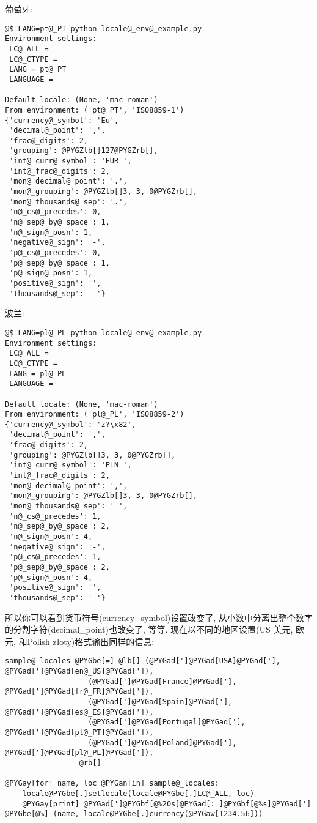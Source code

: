 \documentclass[a4paper,10pt,english]{manual}
\begin{document}
葡萄牙:

\begin{Verbatim}[commandchars=@\[\]]
@$ LANG=pt@_PT python locale@_env@_example.py
Environment settings:
 LC@_ALL =
 LC@_CTYPE =
 LANG = pt@_PT
 LANGUAGE =

Default locale: (None, 'mac-roman')
From environment: ('pt@_PT', 'ISO8859-1')
{'currency@_symbol': 'Eu',
 'decimal@_point': ',',
 'frac@_digits': 2,
 'grouping': @PYGZlb[]127@PYGZrb[],
 'int@_curr@_symbol': 'EUR ',
 'int@_frac@_digits': 2,
 'mon@_decimal@_point': '.',
 'mon@_grouping': @PYGZlb[]3, 3, 0@PYGZrb[],
 'mon@_thousands@_sep': '.',
 'n@_cs@_precedes': 0,
 'n@_sep@_by@_space': 1,
 'n@_sign@_posn': 1,
 'negative@_sign': '-',
 'p@_cs@_precedes': 0,
 'p@_sep@_by@_space': 1,
 'p@_sign@_posn': 1,
 'positive@_sign': '',
 'thousands@_sep': ' '}
\end{Verbatim}

波兰:

\begin{Verbatim}[commandchars=@\[\]]
@$ LANG=pl@_PL python locale@_env@_example.py
Environment settings:
 LC@_ALL =
 LC@_CTYPE =
 LANG = pl@_PL
 LANGUAGE =

Default locale: (None, 'mac-roman')
From environment: ('pl@_PL', 'ISO8859-2')
{'currency@_symbol': 'z?\x82',
 'decimal@_point': ',',
 'frac@_digits': 2,
 'grouping': @PYGZlb[]3, 3, 0@PYGZrb[],
 'int@_curr@_symbol': 'PLN ',
 'int@_frac@_digits': 2,
 'mon@_decimal@_point': ',',
 'mon@_grouping': @PYGZlb[]3, 3, 0@PYGZrb[],
 'mon@_thousands@_sep': ' ',
 'n@_cs@_precedes': 1,
 'n@_sep@_by@_space': 2,
 'n@_sign@_posn': 4,
 'negative@_sign': '-',
 'p@_cs@_precedes': 1,
 'p@_sep@_by@_space': 2,
 'p@_sign@_posn': 4,
 'positive@_sign': '',
 'thousands@_sep': ' '}
\end{Verbatim}

所以你可以看到货币符号(currency\_symbol)设置改变了, 从小数中分离出整个数字的分割字符(decimal\_point)也改变了, 等等. 现在以不同的地区设置(US 美元, 欧元, 和Polish złoty)格式输出同样的信息:

\begin{Verbatim}[commandchars=@\[\]]
sample@_locales @PYGbe[=] @lb[] (@PYGad[']@PYGad[USA]@PYGad['], @PYGad[']@PYGad[en@_US]@PYGad[']),
                   (@PYGad[']@PYGad[France]@PYGad['], @PYGad[']@PYGad[fr@_FR]@PYGad[']),
                   (@PYGad[']@PYGad[Spain]@PYGad['], @PYGad[']@PYGad[es@_ES]@PYGad[']),
                   (@PYGad[']@PYGad[Portugal]@PYGad['], @PYGad[']@PYGad[pt@_PT]@PYGad[']),
                   (@PYGad[']@PYGad[Poland]@PYGad['], @PYGad[']@PYGad[pl@_PL]@PYGad[']),
                 @rb[]

@PYGay[for] name, loc @PYGan[in] sample@_locales:
    locale@PYGbe[.]setlocale(locale@PYGbe[.]LC@_ALL, loc)
    @PYGay[print] @PYGad[']@PYGbf[@%20s]@PYGad[: ]@PYGbf[@%s]@PYGad['] @PYGbe[@%] (name, locale@PYGbe[.]currency(@PYGaw[1234.56]))
\end{Verbatim}
\end{document}

